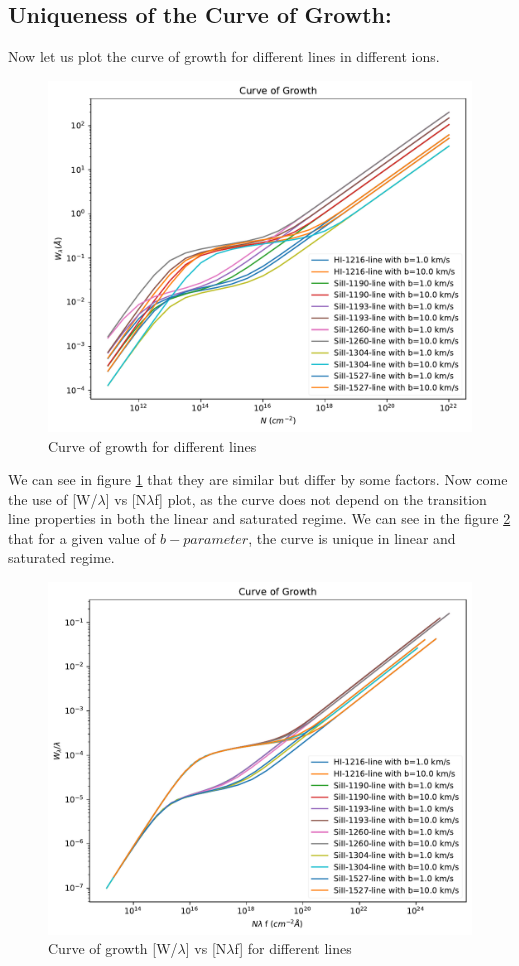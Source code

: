 \documentclass[12pt]{article}
\begin{document}
\subsection{Uniqueness of the Curve of Growth:}
Now let us plot the curve of growth for different lines in different ions. 
\begin{figure}[H]
	\centering
	\includegraphics[width=1\linewidth]{../CoG_multi}
	\caption{Curve of growth for different lines}
	\label{fig:cog_multi}
\end{figure}
We can see in figure \ref{fig:cog_multi} that they are similar but differ by some factors. Now come the use of [W/$\lambda$] vs [N$\lambda$f] plot, as the curve does not depend on the transition line properties in both the linear and saturated regime. We can see  in the figure \ref{fig:cog_multi_gen} that for a given value of $b-parameter$, the curve is unique in linear and saturated regime.

\begin{figure}[H]
	\centering
	\includegraphics[width=1\linewidth]{../CoG_multi_gen}
	\caption{Curve of growth [W/$\lambda$] vs [N$\lambda$f] for different lines}
	\label{fig:cog_multi_gen}
\end{figure}
\end{document}
